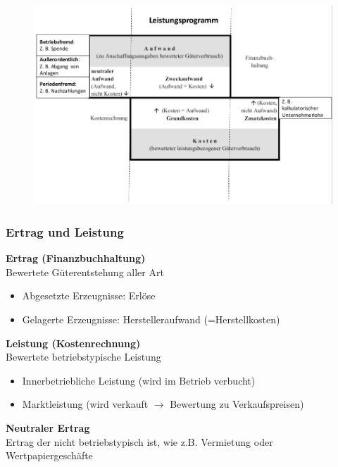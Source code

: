 \documentclass[a4paper,11pt, twoside]{article}
\begin{document}
\begin{figure}[h]
 \begin{center}
   \includegraphics[scale=0.3]{bilder/leistungsprogramm.png}
 \end{center}
\end{figure}

\subsubsection*{Ertrag und Leistung}

\textbf{Ertrag (Finanzbuchhaltung)}\\
Bewertete Güterentstehung aller Art
\begin{itemize}
	\item Abgesetzte Erzeugnisse: Erlöse
	\item Gelagerte Erzeugnisse: Herstelleraufwand (=Herstellkosten)
\end{itemize}

\textbf{Leistung (Kostenrechnung)}\\
Bewertete betriebstypische Leistung
\begin{itemize}
	\item Innerbetriebliche Leistung (wird im Betrieb verbucht)
	\item Marktleistung (wird verkauft $\rightarrow$ Bewertung zu Verkaufspreisen)
\end{itemize}

\textbf{Neutraler Ertrag}\\
Ertrag der nicht betriebstypisch ist, wie z.B. Vermietung oder Wertpapiergeschäfte
\end{document}
